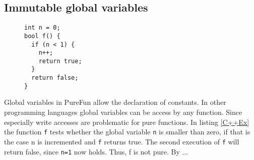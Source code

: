 \subsection{Immutable global variables}
\begin{figure}[h]
\begin{lstlisting}[caption={C++ code that uses a global variable.},label={C++Ex}]
int n = 0;
bool f() {
  if (n < 1) {
    n++;
    return true;
  }
  return false;
}
\end{lstlisting}
\end{figure}
Global variables in PureFun allow the declaration of constants. In other programming languages global variables can be access by any function. Since especially write accesses are problematic for pure functions. In listing \ref{C++Ex} the function \texttt{f} tests whether the global variable \texttt{n} is smaller than zero, if that is the case n is incremented and \texttt{f} returns true. The second execution of \texttt{f} will return false, since \texttt{n=1} now holds. Thus, f is not pure. By ...
